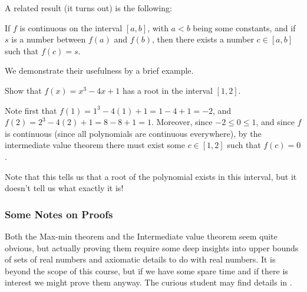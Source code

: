 \noindent
A related result (it turns out) is the following:

\begin{theorem}
	If $f$ is continuous on the interval $[a, b]$, with $a < b$ being some constants, and if $s$ is a number between $f(a)$ and $f(b)$, then there exists a number $c \in [a, b]$ such that $f(c) = s$.
\end{theorem}

\noindent
We demonstrate their usefulness by a brief example.

\begin{example}
	Show that $f(x) = x^3 - 4x + 1$ has a root in the interval $[1, 2]$.

	Note first that $f(1) = 1^3 - 4 (1) + 1 = 1 - 4 + 1 = -2$, and $f(2) = 2^3 - 4(2) + 1 = 8 - 8 + 1 = 1$. Moreover, since $-2 \leq 0 \leq 1$, and since $f$ is continuous (since all polynomials are continuous everywhere), by the intermediate value theorem there must exist some $c \in [1, 2]$ such that $f(c) = 0$.

	Note that this tells us that a root of the polynomial exists in this interval, but it doesn't tell us what exactly it is!
\end{example}

\subsubsection*{Some Notes on Proofs}

Both the Max-min theorem and the Intermediate value theorem seem quite obvious, but actually proving them require some deep insights into upper bounds of sets of real numbers and axiomatic details to do with real numbers. It is beyond the scope of this course, but if we have some spare time and if there is interest we might prove them anyway. The curious student may find details in \cite[Appendix~]{Adams2013}.
